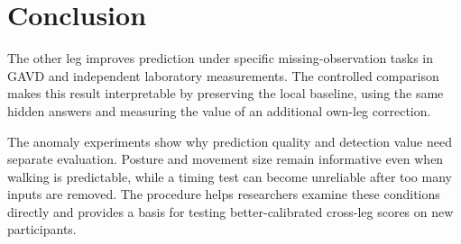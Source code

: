 \documentclass[letterpaper]{article}
\begin{document}
\section{Conclusion}

The other leg improves prediction under specific missing-observation tasks in GAVD and independent laboratory measurements. The controlled comparison makes this result interpretable by preserving the local baseline, using the same hidden answers and measuring the value of an additional own-leg correction.

The anomaly experiments show why prediction quality and detection value need separate evaluation. Posture and movement size remain informative even when walking is predictable, while a timing test can become unreliable after too many inputs are removed. The procedure helps researchers examine these conditions directly and provides a basis for testing better-calibrated cross-leg scores on new participants.

\end{document}
